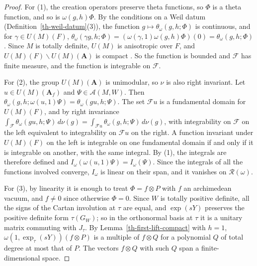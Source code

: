 \begin{proof}
For (1), the creation operators preserve theta functions, so $\Phi$ is a
theta function, and so is $\omega(g,h)\Phi$. By the conditions on a Weil
datum (Definition~\ref{th-weil-datum}(3)), the function
$g\mapsto\theta_\omega(g,h;\Phi)$ is continuous, and for $\gamma\in U(M)(F)$,
$\theta_\omega(\gamma g,h;\Phi)=(\omega(\gamma,1)\omega(g,h)\Phi)(0)=\theta_\omega(g,h;\Phi)$.
Since $M$ is totally definite, $U(M)$ is anisotropic over $F$, and
$U(M)(F)\backslash U(M)(\mathbf A)$ is compact \cite{Bor69}. So the function is
bounded and $\mathcal F$ has finite measure, and the function is integrable on
$\mathcal F$.

For (2), the group $U(M)(\mathbf A)$ is unimodular, so $\nu$ is also right
invariant. Let $u\in U(M)(\mathbf A_f)$ and $\Psi\in\mathcal A(M,W)$. Then
$\theta_\omega(g,h;\omega(u,1)\Psi)=\theta_\omega(gu,h;\Psi)$. The set
$\mathcal Fu$ is a fundamental domain for $U(M)(F)$, and by right invariance
$\int_{\mathcal F}\theta_\omega(gu,h;\Psi)\,d\nu(g)=\int_{\mathcal Fu}\theta_\omega(g,h;\Psi)\,d\nu(g)$,
with integrability on $\mathcal F$ on the left equivalent to integrability on
$\mathcal Fu$ on the right. A function invariant under $U(M)(F)$ on the left
is integrable on one fundamental domain if and only if it is integrable on
another, with the same integral. By (1), the integrals are therefore defined
and $I_\omega(\omega(u,1)\Psi)=I_\omega(\Psi)$. Since the integrals of all the
functions involved converge, $I_\omega$ is linear on their span, and it
vanishes on $\mathcal R(\omega)$.

For (3), by linearity it is enough to treat $\Phi=f\otimes P$ with $f$ an
archimedean vacuum, and $f\neq0$ since otherwise $\Phi=0$. Since $W$ is
totally positive definite, all the signs of the Cartan involution at $\tau$
are equal, and $\exp(sY)$ preserves the positive definite form $\tau(G_W)$; so
in the orthonormal basis at $\tau$ it is a unitary matrix commuting with
$J_\tau$. By Lemma~\ref{th-first-lift-compact} with $h=1$,
$\omega(1,\exp_\tau(sY))(f\otimes P)$ is a multiple of $f\otimes Q$ for a
polynomial $Q$ of total degree at most that of $P$. The vectors $f\otimes Q$
with such $Q$ span a finite-dimensional space.
\end{proof}

